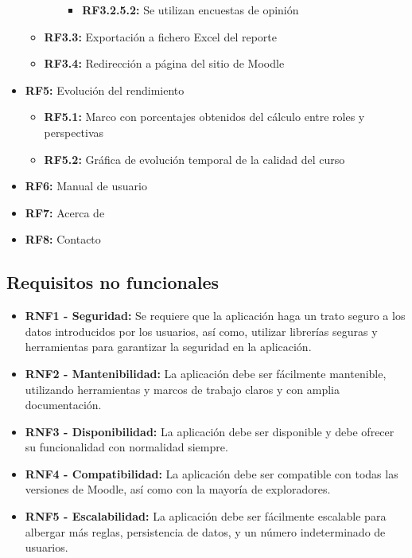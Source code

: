 \begin{itemize}
\begin{itemize}
\begin{itemize}
\begin{itemize}
                            \item \textbf{RF3.2.5.2:} Se utilizan encuestas de opinión
                        \end{itemize}
                \end{itemize}
            \item \textbf{RF3.3:} Exportación a fichero Excel del reporte
            \item \textbf{RF3.4:} Redirección a página del sitio de Moodle
        \end{itemize}
    \item \textbf{RF5:} Evolución del rendimiento
        \begin{itemize}
            \item \textbf{RF5.1:} Marco con porcentajes obtenidos del cálculo entre roles y perspectivas
            \item \textbf{RF5.2:} Gráfica de evolución temporal de la calidad del curso
        \end{itemize}
    \item \textbf{RF6:} Manual de usuario
    \item \textbf{RF7:} Acerca de
    \item \textbf{RF8:} Contacto
\end{itemize}

\subsection{Requisitos no funcionales}

\begin{itemize}
    \item \textbf{RNF1 - Seguridad:} Se requiere que la aplicación haga un trato seguro a los datos introducidos por los usuarios, así como, utilizar librerías seguras y herramientas para garantizar la seguridad en la aplicación. 
    \item \textbf{RNF2 - Mantenibilidad:}  La aplicación debe ser fácilmente mantenible, utilizando herramientas y marcos de trabajo claros y con amplia documentación.
    \item \textbf{RNF3 - Disponibilidad:} La aplicación debe ser disponible y debe ofrecer su funcionalidad con normalidad siempre.
    \item \textbf{RNF4 - Compatibilidad:} La aplicación debe ser compatible con todas las versiones de Moodle, así como con la mayoría de exploradores. 
    \item \textbf{RNF5 - Escalabilidad:}  La aplicación debe ser fácilmente escalable para albergar más reglas, persistencia de datos, y un número indeterminado de usuarios.
\end{itemize}

